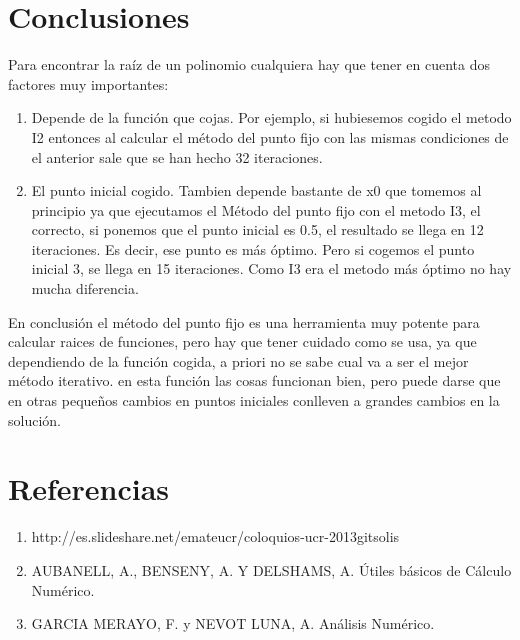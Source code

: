 \documentclass[a4paper]{article}
\begin{document}
\section{Conclusiones}
Para encontrar la raíz de un polinomio cualquiera hay que tener en cuenta dos factores muy importantes:
\begin{enumerate}
\item Depende de la función que cojas. Por ejemplo, si hubiesemos cogido el metodo I2 entonces al calcular el método del punto fijo con las mismas condiciones de el anterior sale que se han hecho 32 iteraciones.
\item El punto inicial cogido. Tambien depende bastante de x0 que tomemos al principio ya que ejecutamos el Método del punto fijo con el metodo I3, el correcto, si ponemos que el punto inicial es 0.5, el resultado se llega en 12 iteraciones. Es decir, ese punto es más óptimo. Pero si cogemos el punto inicial 3, se llega en 15 iteraciones. Como I3 era el metodo más óptimo no hay mucha diferencia.
\end{enumerate}
En conclusión el método del punto fijo es una herramienta muy potente para calcular raices de funciones, pero hay que tener cuidado como se usa, ya que dependiendo de la función cogida, a priori no se sabe cual va a ser el mejor método iterativo. en esta función las cosas funcionan bien, pero puede darse que en otras pequeños cambios en puntos iniciales conlleven a grandes cambios en la solución.

\section{Referencias}
\begin{enumerate}
\item{http://es.slideshare.net/emateucr/coloquios-ucr-2013gitsolis}
\item{AUBANELL, A., BENSENY, A. Y DELSHAMS, A.  Útiles básicos de Cálculo Numérico.}
\item{GARCIA MERAYO, F. y NEVOT LUNA, A.  Análisis Numérico.}
\end{enumerate}
\end{document}
